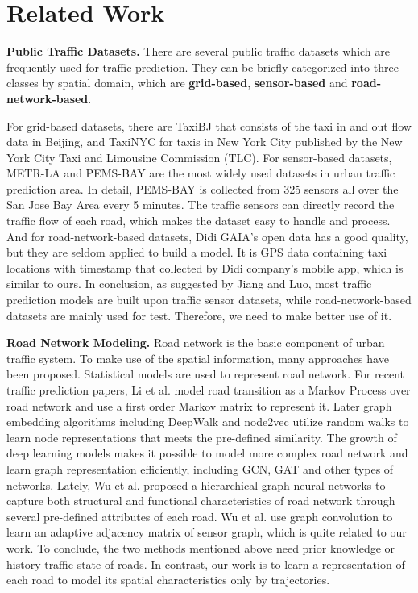 
\section{Related Work}
\textbf{Public Traffic Datasets.} There are several public traffic datasets which are frequently used for traffic prediction. They can be briefly categorized into three classes by spatial domain, which are \textbf{grid-based}, \textbf{sensor-based} and \textbf{road-network-based}.

For grid-based datasets, there are TaxiBJ\cite{taxibj} that consists of the taxi in and out flow data in Beijing, and TaxiNYC for taxis in New York City published by the New York City Taxi and Limousine Commission (TLC). For sensor-based datasets, METR-LA\cite{DCRNN} and PEMS-BAY are the most widely used datasets in urban traffic prediction area. In detail, PEMS-BAY is collected from 325 sensors all over the San Jose Bay Area every 5 minutes. The traffic sensors can directly record the traffic flow of each road, which makes the dataset easy to handle and process. And for road-network-based datasets, Didi GAIA's open data has a good quality, but they are seldom applied to build a model. It is GPS data containing taxi locations with timestamp that collected by Didi company's mobile app, which is similar to ours. In conclusion, as suggested by Jiang and Luo\cite{surveyGNN}, most traffic prediction models are built upon traffic sensor datasets, while road-network-based datasets are mainly used for test. Therefore, we need to make better use of it.

\vspace{\baselineskip}

\textbf{Road Network Modeling.} Road network is the basic component of urban traffic system. To make use of the spatial information, many approaches have been proposed. Statistical models are used to represent road network. For recent traffic prediction papers, Li et al.\cite{AAAI21} model road transition as a Markov Process over road network and use a first order Markov matrix to represent it. Later graph embedding algorithms including DeepWalk\cite{deepwalk} and node2vec\cite{node2vec} utilize random walks to learn node representations that meets the pre-defined similarity. The growth of deep learning models makes it possible to model more complex road network and learn graph representation efficiently, including GCN\cite{GCN0}, GAT\cite{GAT} and other types of networks. Lately, Wu et al.\cite{roadrep} proposed a hierarchical graph neural networks to capture both structural and functional characteristics of road network through several pre-defined attributes of each road. Wu et al.\cite{GWNET} use graph convolution to learn an adaptive adjacency matrix of sensor graph, which is quite related to our work. To conclude, the two methods mentioned above need prior knowledge or history traffic state of roads. In contrast, our work is to learn a representation of each road to model its spatial characteristics only by trajectories.

